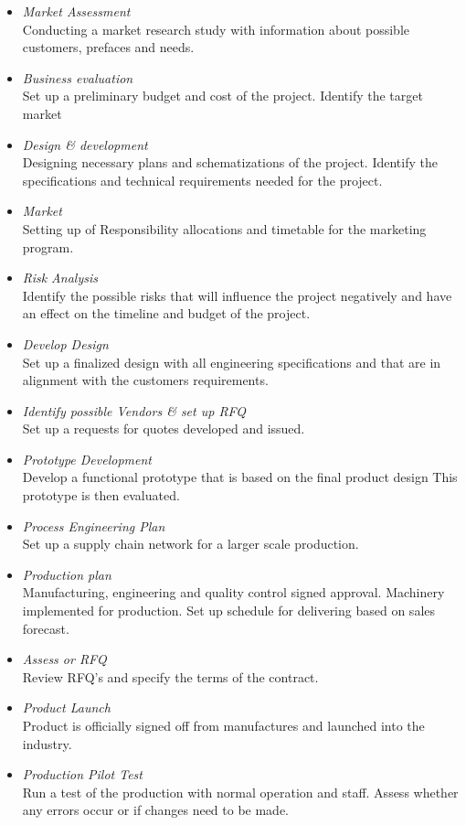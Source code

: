 \begin{itemize}
\item \emph{Market Assessment}\\
Conducting a market research study with information about possible customers, prefaces and needs.
\item \emph{Business evaluation}\\
Set up a preliminary budget and cost of the project. Identify the target market
\item \emph{Design \& development}\\
Designing necessary plans and schematizations of the project. Identify the specifications and technical requirements needed for the project.
\item \emph{Market}\\
Setting up of Responsibility allocations and timetable for the marketing program.
\item \emph{Risk Analysis}\\
Identify the possible risks that will influence the project negatively and have an effect on the timeline and budget of the project.
\item \emph{Develop Design}\\
Set up a finalized design with all engineering specifications and that are in alignment with the customers requirements.
\item \emph{Identify possible Vendors \& set up RFQ}\\
Set up a requests for quotes developed and issued.
\item \emph{Prototype Development}\\
Develop a functional prototype that is based on the final product design This prototype is then evaluated.
\item \emph{Process Engineering Plan}\\
Set up a supply chain network for a larger scale production.
\item \emph{Production plan}\\
Manufacturing, engineering and quality control signed approval. Machinery implemented for production. Set up schedule for delivering based on sales forecast.
\item \emph{Assess or RFQ}\\
Review RFQ’s and specify the terms of the contract.
\item \emph{Product Launch}\\
Product is officially signed off from manufactures and launched into the industry.
\item \emph{Production Pilot Test}\\
Run a test of the production with normal operation and staff. Assess whether any errors occur or if changes need to be made.
\end{itemize}
